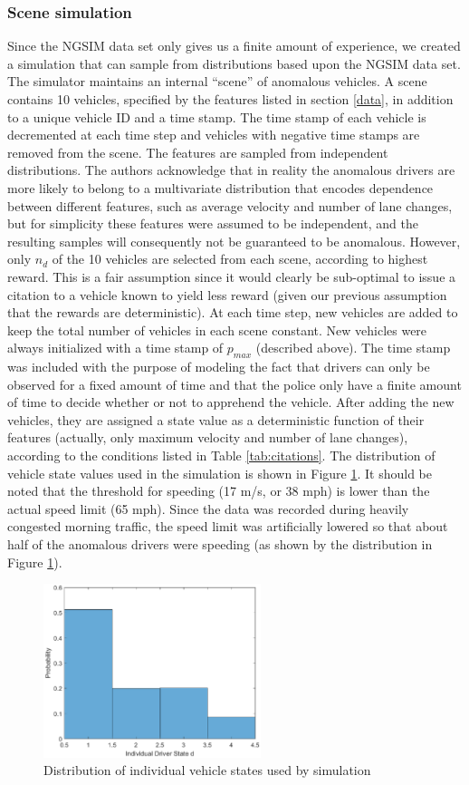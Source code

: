 \documentclass[10pt,journal]{IEEEtran}
\begin{document}
\subsubsection*{Scene simulation}
Since the NGSIM data set only gives us a finite amount of experience, we created a simulation that can sample from distributions based upon the NGSIM data set. The simulator maintains an internal ``scene'' of anomalous vehicles. A scene contains 10 vehicles, specified by the features listed in section \ref{data}, in addition to a unique vehicle ID and a time stamp. The time stamp of each vehicle is decremented at each time step and vehicles with negative time stamps are removed from the scene. The features are sampled from independent distributions. The authors acknowledge that in reality the anomalous drivers are more likely to belong to a multivariate distribution that encodes dependence between different features, such as average velocity and number of lane changes, but for simplicity these features were assumed to be independent, and the resulting samples will consequently not be guaranteed to be anomalous. However, only $n_d$ of the 10 vehicles are selected from each scene, according to highest reward. This is a fair assumption since it would clearly be sub-optimal to issue a citation to a vehicle known to yield less reward (given our previous assumption that the rewards are deterministic). At each time step, new vehicles are added to keep the total number of vehicles in each scene constant. New vehicles were always initialized with a time stamp of $p_{max}$ (described above). The time stamp was included with the purpose of modeling the fact that drivers can only be observed for a fixed amount of time and that the police only have a finite amount of time to decide whether or not to apprehend the vehicle. After adding the new vehicles, they are assigned a state value as a deterministic function of their features (actually, only maximum velocity and number of lane changes), according to the conditions listed in Table \ref{tab:citations}. The distribution of vehicle state values used in the simulation is shown in Figure \ref{fig:statehist}. It should be noted that the threshold for speeding (17 m/s, or 38 mph) is lower than the actual speed limit (65 mph). Since the data was recorded during heavily congested morning traffic, the speed limit was artificially lowered so that about half of the anomalous drivers were speeding (as shown by the distribution in Figure \ref{fig:statehist}). 

\begin{figure}[!t]
\centering
\includegraphics[width=2.5in]{Figures/DriverStateHistogram}
\caption{Distribution of individual vehicle states used by simulation}
\label{fig:statehist}
\end{figure}
\end{document}
